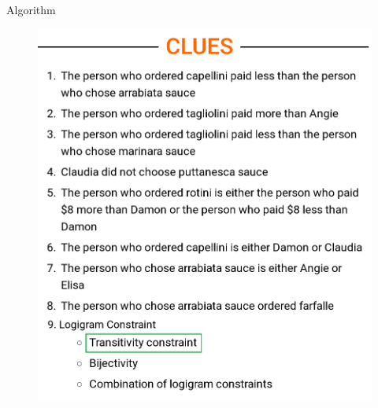 \documentclass{beamer}
\begin{document}
\begin{frame}{Algorithm}
{\begin{minipage}[t]{0.40\textwidth}
\begin{figure}[h]
                \includegraphics[width=\textwidth]{figures/clue_transitivity}
                \label{clues}
            \end{figure}

        \end{minipage}

    }


\end{frame}
\end{document}
